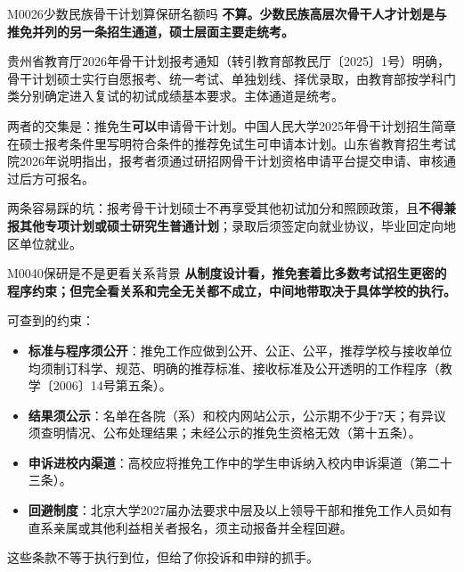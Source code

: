 \begin{qa}{M0026}{少数民族骨干计划算保研名额吗}
\textbf{不算。少数民族高层次骨干人才计划是与推免并列的另一条招生通道，硕士层面主要走统考。}

贵州省教育厅2026年骨干计划报考通知（转引教育部教民厅〔2025〕1号）明确，骨干计划硕士实行自愿报考、统一考试、单独划线、择优录取，由教育部按学科门类分别确定进入复试的初试成绩基本要求。主体通道是统考。

两者的交集是：推免生\textbf{可以}申请骨干计划。中国人民大学2025年骨干计划招生简章在硕士报考条件里写明符合条件的推荐免试生可申请本计划。山东省教育招生考试院2026年说明指出，报考者须通过研招网骨干计划资格申请平台提交申请、审核通过后方可报名。

两条容易踩的坑：报考骨干计划硕士不再享受其他初试加分和照顾政策，且\textbf{不得兼报其他专项计划或硕士研究生普通计划}；录取后须签定向就业协议，毕业回定向地区单位就业。
\end{qa}

\begin{qa}{M0040}{保研是不是更看关系背景}
\textbf{从制度设计看，推免套着比多数考试招生更密的程序约束；但完全看关系和完全无关都不成立，中间地带取决于具体学校的执行。}

可查到的约束：

\begin{itemize}
  \item \textbf{标准与程序须公开}：推免工作应做到公开、公正、公平，推荐学校与接收单位均须制订科学、规范、明确的推荐标准、接收标准及公开透明的工作程序（教学〔2006〕14号第五条）。
  \item \textbf{结果须公示}：名单在各院（系）和校内网站公示，公示期不少于7天；有异议须查明情况、公布处理结果；未经公示的推免生资格无效（第十五条）。
  \item \textbf{申诉进校内渠道}：高校应将推免工作中的学生申诉纳入校内申诉渠道（第二十三条）。
  \item \textbf{回避制度}：北京大学2027届办法要求中层及以上领导干部和推免工作人员如有直系亲属或其他利益相关者报名，须主动报备并全程回避。
\end{itemize}

这些条款不等于执行到位，但给了你投诉和申辩的抓手。
\end{qa}

